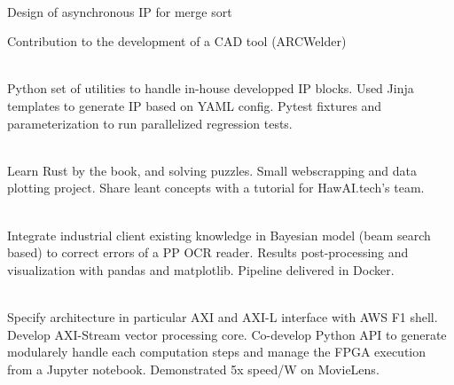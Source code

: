 \documentclass[a4paper]{MagicalCV}
\begin{document}
\begin{minipage}[t]{0.66\textwidth}
 \\
\vspace{\topsep} %
\begin{tightemize}
\item Design of asynchronous IP for merge sort
\item Contribution to the development of a CAD tool (ARCWelder)
\end{tightemize}
\sectionsep



 \\
Python set of utilities to handle in-house developped IP blocks.
Used Jinja templates to generate IP based on YAML config. Pytest fixtures
and parameterization to run parallelized regression tests.
\sectionsep

 \\
Learn Rust by the book, and solving puzzles. Small webscrapping and data plotting
project. Share leant concepts with a tutorial for HawAI.tech's team.
\sectionsep

 \\
Integrate industrial client existing knowledge in Bayesian model (beam search
based) to correct errors of a PP OCR reader. Results post-processing and visualization
with pandas and matplotlib. Pipeline delivered in Docker.
\sectionsep

 \\
Specify architecture in particular AXI and AXI-L interface with AWS F1 shell.
Develop AXI-Stream vector processing core. Co-develop Python API to generate
modularely handle each computation steps and manage the FPGA execution from a
Jupyter notebook. Demonstrated 5x speed/W on MovieLens.
\sectionsep

\end{minipage}
\end{document}
